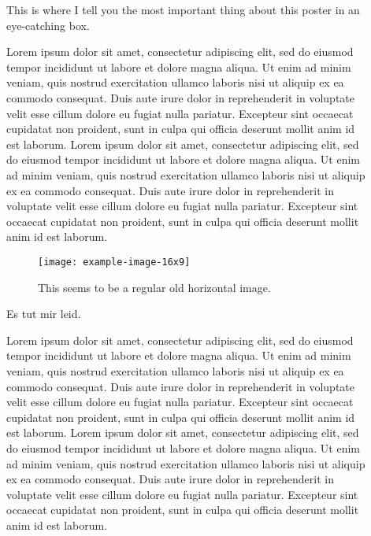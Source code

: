 \documentclass[20pt]{beamer}
\newlength{\sepwidth}
\newlength{\colwidth}
\newcommand{\separatorcolumn}{\begin{column}{\sepwidth}\end{column}}
\begin{document}
\begin{frame}[t]
\begin{columns}[t]
\begin{column}{\colwidth}
\begin{tcolorbox}[title=Etwas]
\end{tcolorbox}

\end{column}
\separatorcolumn
\begin{column}{\colwidth}%

\begin{tcolorbox}[title=\LARGE{Take-Home Message}, every float=\centering, colframe=black]
\Large{
This is where I tell you the most important thing about this poster in an eye-catching box.
}
\end{tcolorbox}

\begin{tcolorbox}[title=Etwas, every float=\centering]
Lorem ipsum dolor sit amet, consectetur adipiscing elit, sed do eiusmod tempor incididunt ut labore et dolore magna aliqua. 
Ut enim ad minim veniam, quis nostrud exercitation ullamco laboris nisi ut aliquip ex ea commodo consequat. 
Duis aute irure dolor in reprehenderit in voluptate velit esse cillum dolore eu fugiat nulla pariatur. 
Excepteur sint occaecat cupidatat non proident, sunt in culpa qui officia deserunt mollit anim id est laborum. 
Lorem ipsum dolor sit amet, consectetur adipiscing elit, sed do eiusmod tempor incididunt ut labore et dolore magna aliqua. 
Ut enim ad minim veniam, quis nostrud exercitation ullamco laboris nisi ut aliquip ex ea commodo consequat. 
Duis aute irure dolor in reprehenderit in voluptate velit esse cillum dolore eu fugiat nulla pariatur. 
Excepteur sint occaecat cupidatat non proident, sunt in culpa qui officia deserunt mollit anim id est laborum.

\begin{figure}[htb]
\centering
\texttt{[image: example-image-16x9]}
\caption{This seems to be a regular old horizontal image.}
\end{figure}

Es tut mir leid.
\end{tcolorbox}

\begin{tcolorbox}[title=Etwas]
Lorem ipsum dolor sit amet, consectetur adipiscing elit, sed do eiusmod tempor incididunt ut labore et dolore magna aliqua. 
Ut enim ad minim veniam, quis nostrud exercitation ullamco laboris nisi ut aliquip ex ea commodo consequat. 
Duis aute irure dolor in reprehenderit in voluptate velit esse cillum dolore eu fugiat nulla pariatur. 
Excepteur sint occaecat cupidatat non proident, sunt in culpa qui officia deserunt mollit anim id est laborum. 
Lorem ipsum dolor sit amet, consectetur adipiscing elit, sed do eiusmod tempor incididunt ut labore et dolore magna aliqua. 
Ut enim ad minim veniam, quis nostrud exercitation ullamco laboris nisi ut aliquip ex ea commodo consequat. 
Duis aute irure dolor in reprehenderit in voluptate velit esse cillum dolore eu fugiat nulla pariatur. 
Excepteur sint occaecat cupidatat non proident, sunt in culpa qui officia deserunt mollit anim id est laborum.


\end{tcolorbox}
\end{column}
\end{columns}
\end{frame}
\end{document}
